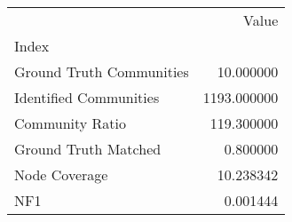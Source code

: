 \begin{tabular}{lr}
\toprule
{} &        Value \\
Index                    &              \\
\midrule
Ground Truth Communities &    10.000000 \\
Identified Communities   &  1193.000000 \\
Community Ratio          &   119.300000 \\
Ground Truth Matched     &     0.800000 \\
Node Coverage            &    10.238342 \\
NF1                      &     0.001444 \\
\bottomrule
\end{tabular}
